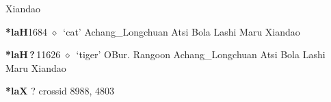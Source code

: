\begin{list}{}{\leftmargin=1.5em \itemindent=-1.5em}
\hspace{1ex}
         Xiandao 
  \item {\footnotesize \textbf{*laH}}{\tiny 1684}
\hspace{1ex}
         $\diamond$~`cat'
         Achang\_Longchuan 
\hspace{1ex}
         Atsi 
\hspace{1ex}
         Bola 
\hspace{1ex}
         Lashi 
\hspace{1ex}
         Maru 
\hspace{1ex}
         Xiandao 
  \item {\footnotesize \textbf{*laH\,?\,}}{\tiny 11626}
\hspace{1ex}
         $\diamond$~`tiger'
         OBur. 
\hspace{1ex}
         Rangoon 
\hspace{1ex}
         Achang\_Longchuan 
\hspace{1ex}
         Atsi 
\hspace{1ex}
         Bola 
\hspace{1ex}
         Lashi 
\hspace{1ex}
         Maru 
\hspace{1ex}
         Xiandao 
  \end{list}
\item
\textbf{*laX}
?
  {\tiny crossid 8988, 4803}

